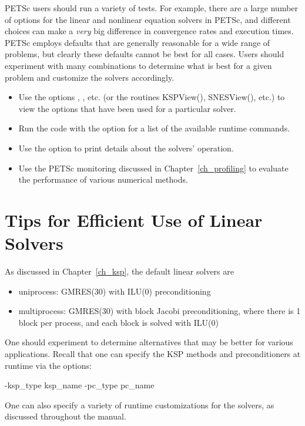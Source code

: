 {{PETSc users should run a variety of tests.  For example, there are a large number of options 
for the linear and nonlinear equation solvers in PETSc, and different 
choices can make a {\em very} big difference in convergence rates and execution 
times.  PETSc employs defaults that are generally reasonable for a wide
range of problems, but clearly these defaults cannot be best for all
cases.  Users should experiment with many combinations to determine 
what is best for a given problem and customize the solvers accordingly.
\begin{itemize}
\item Use the options , , etc. (or the routines 
     KSPView(), SNESView(), etc.) to view the options that have been
     used for a particular solver.
\item Run the code with the option  for a list of the available 
     runtime commands.
\item Use the option  to print details about the solvers' operation.
\item Use the PETSc monitoring discussed in Chapter~\ref{ch_profiling}
     to evaluate the performance of various numerical methods.
\end{itemize}

\section{Tips for Efficient Use of Linear Solvers}
\label{sec_slestips}

As discussed in Chapter~\ref{ch_ksp}, the default linear solvers are
\begin{itemize}
\item uniprocess: GMRES(30) with ILU(0) preconditioning\\
\item multiprocess: GMRES(30) with block Jacobi preconditioning, where there
                     is 1 block per process, and each block is solved with ILU(0)\\
\end{itemize}
One should experiment to determine alternatives that may be better for
various applications.  Recall that one can specify the KSP methods and
preconditioners at runtime via the options:
\begin{tabbing}
   -ksp\_type \trl{<}ksp\_name\trl{>} -pc\_type \trl{<}pc\_name\trl{>}
\end{tabbing}
One can also specify a variety of runtime customizations for the
solvers, as discussed throughout the manual.

}}
